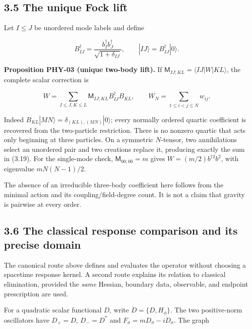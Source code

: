 \hypertarget{the-unique-fock-lift}{%
\subsection{3.5 The unique Fock lift}\label{the-unique-fock-lift}}

Let \(I\le J\) be unordered mode labels and define

\[
B^\dagger_{IJ}=\frac{b_I^\dagger b_J^\dagger}{\sqrt{1+\delta_{IJ}}},
\qquad |IJ\rangle=B^\dagger_{IJ}|0\rangle .
\]

\textbf{Proposition PHY-03 (unique two-body lift).} If \(\mathsf M_{IJ;KL}=\langle IJ|W|KL\rangle\), the complete scalar correction is

\[
\boxed{
W=\sum_{I\le J,K\le L}
\mathsf M_{IJ;KL}B^\dagger_{IJ}B_{KL},
\qquad
W_N=\sum_{1\le i<j\le N}w_{ij}.
}
\tag{3.19}
\]

Indeed \(B_{KL}|MN\rangle=\delta_{(KL),(MN)}|0\rangle\); every normally ordered quartic coefficient is recovered from the two-particle restriction. There is no nonzero quartic that acts only beginning at three particles. On a symmetric \(N\)-tensor, two annihilations select an unordered pair and two creations replace it, producing exactly the sum in (3.19). For the single-mode check, \(\mathsf M_{00;00}=m\) gives \(W=(m/2)b^{\dagger2}b^2\), with eigenvalue \(mN(N-1)/2\).

The absence of an irreducible three-body coefficient here follows from the minimal action and its coupling/field-degree count. It is not a claim that gravity is pairwise at every order.

\hypertarget{the-classical-response-comparison-and-its-precise-domain}{%
\subsection{3.6 The classical response comparison and its precise domain}\label{the-classical-response-comparison-and-its-precise-domain}}

The canonical route above defines and evaluates the operator without choosing a spacetime response kernel. A second route explains its relation to classical elimination, provided the \emph{same} Hessian, boundary data, observable, and endpoint prescription are used.

For a quadratic scalar functional \(D\), write \(\dot D=\{D,H_\phi\}\). The two positive-norm oscillators have \(D_+=D\), \(D_-=D^*\) and \(F_\sigma=mD_\sigma-i\dot D_\sigma\). The graph

